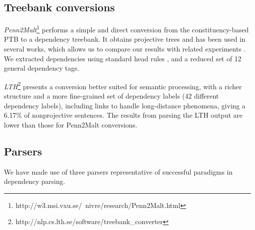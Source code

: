 \documentclass[11pt]{article}
\begin{document}
\subsection{Treebank conversions}\label{conversions}


\emph{Penn2Malt}\footnote{http://w3.msi.vxu.se/~nivre/research/Penn2Malt.html} performs a simple and direct conversion from the constituency-based PTB to a dependency treebank. It obtains projective trees and has been used in several works, which allows us to  compare our results with related experiments \cite{koo-carreras-collins:2008:ACLMain,suzuki-EtAl:2009:EMNLP,koo-collins:2010:ACL}. We extracted dependencies using standard head rules \cite{Yamada-and-Matsumoto}, and a reduced set of 12 general dependency tags.%


\emph{LTH}\footnote{http://nlp.cs.lth.se/software/treebank\_converter} \cite{johansson2007a} presents a conversion better suited for semantic processing, with a richer structure and a more fine-grained set of dependency labels (42 different dependency labels), including links
to handle long-distance phenomena, giving a 6.17\% of  nonprojective sentences. The results from parsing the LTH output are lower than those for Penn2Malt conversions.





\subsection{Parsers}\label{parsers}
We have made use of three parsers representative of successful paradigms in dependency parsing. 
\end{document}
